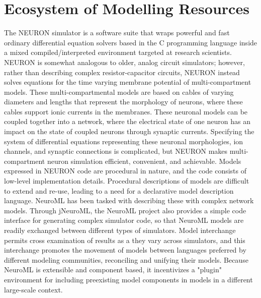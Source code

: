 \section{Ecosystem of Modelling Resources}
The NEURON simulator is a software suite that wraps powerful and fast ordinary differential equation solvers based in the C programming language inside a mixed compiled/interpreted environment targeted at research scientists. NEURON is somewhat analogous to older, analog circuit simulators; however, rather than describing complex resistor-capacitor circuits, NEURON instead solves equations for the time varying membrane potential of multi-compartment models.\newline
\newline
These multi-compartmental models are based on cables of varying diameters and lengths that represent the morphology of neurons, where these cables support ionic currents in the membranes. These neuronal models can be coupled together into a network, where the electrical state of one neuron has an impact on the state of coupled neurons through synaptic currents. Specifying the system of differential equations representing these neuronal morphologies, ion channels, and synaptic connections is complicated, but NEURON makes multi-compartment neuron simulation efficient, convenient, and achievable. Models expressed in NEURON code are procedural in nature, and the code consists of low-level implementation details. Procedural descriptions of models are difficult to extend and re-use, leading to a need for a declarative model description language. NeuroML has been tasked with describing these with complex network models.\newline
\newline
Through jNeuroML, the NeuroML project also provides a simple code interface for generating complex simulator code, so that NeuroML models are readily exchanged between different types of simulators. Model interchange permits cross examination of results as a they vary across simulators, and this interchange promotes the movement of models between languages preferred by different modeling communities, reconciling and unifying their models. Because NeuroML is extensible and component based, it incentivizes a "plug\-in" environment for including pre\-existing model components in models in a different large-scale context.


